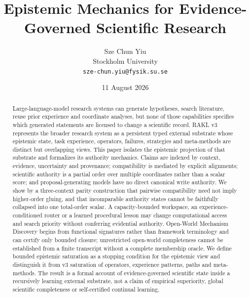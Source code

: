 \documentclass[11pt]{article}
\title{Epistemic Mechanics for Evidence-Governed Scientific Research}
\author{Sze Chun Yiu\\Stockholm University\\\texttt{sze-chun.yiu@fysik.su.se}}
\date{11 August 2026}
\begin{document}
\setlength{\emergencystretch}{3em}
\allowdisplaybreaks
\maketitle

\begin{abstract}
Large-language-model research systems can generate hypotheses, search literature, reuse prior experience and coordinate analyses, but none of those capabilities specifies which generated statements are licensed to change a scientific record. RAKL v3 represents the broader research system as a persistent typed external substrate whose epistemic state, task experience, operators, failures, strategies and meta-methods are distinct but overlapping views. This paper isolates the epistemic projection of that substrate and formalizes its authority mechanics. Claims are indexed by context, evidence, uncertainty and provenance; compatibility is mediated by explicit alignments; scientific authority is a partial order over multiple coordinates rather than a scalar score; and proposal-generating models have no direct canonical write authority. We show by a three-context parity construction that pairwise compatibility need not imply higher-order gluing, and that incomparable authority states cannot be faithfully collapsed into one total-order scalar. A capacity-bounded workspace, an experience-conditioned router or a learned procedural lesson may change computational access and search priority without conferring evidential authority. Open-World Mechanism Discovery begins from functional signatures rather than framework terminology and can certify only bounded closure; unrestricted open-world completeness cannot be established from a finite transcript without a complete membership oracle. We define bounded epistemic saturation as a stopping condition for the epistemic view and distinguish it from v3 saturation of operators, experience patterns, paths and meta-methods. The result is a formal account of evidence-governed scientific state inside a recursively learning external substrate, not a claim of empirical superiority, global scientific completeness or self-certified continual learning.
\end{abstract}



















\end{document}
